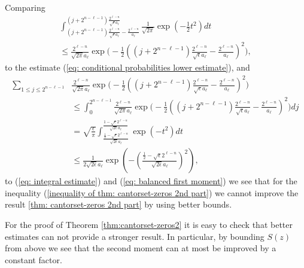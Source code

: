 \documentclass[11pt,reqno]{amsart}
\theoremstyle{plain}
\theoremstyle{definition}
\theoremstyle{remark}
\begin{document}
Comparing
\begin{multline*}
\int_{(j+2^{n-\ell-1})\frac{2^{\ell-n}}{\sqrt{\epsilon}a_\ell}-\frac{2^{\ell-n}}{a_\ell}}^{(j+2^{n-\ell-1})\frac{2^{\ell-n}}{\sqrt{\epsilon}a_\ell}} \frac{1}{\sqrt{2\pi}}\exp (-\frac{1}{2}t^2) dt \\ \leq
\frac{2^{\ell-n}}{\sqrt{2\pi}a_\ell} \exp\Big(-\frac{1}{2} {((j+2^{n-\ell-1})\frac{2^{\ell-n}}{\sqrt{\epsilon}a_\ell}-\frac{2^{\ell-n}}{a_\ell})^2}\Big),
\end{multline*}
to the estimate (\ref{eq: conditional probabilities lower estimate}), and
\begin{align*}
\sum_{1\leq j \leq 2^{n-\ell-1}}& \frac{2^{\ell-n}}{\sqrt{2\pi}a_\ell} \exp\Big(-\frac{1}{2} {((j+2^{n-\ell-1})\frac{2^{\ell-n}}{\sqrt{\epsilon}a_\ell}-\frac{2^{\ell-n}}{a_\ell})^2}\Big) \\ &\leq
\int_0^{2^{n-\ell-1}} \frac{2^{\ell-n}}{\sqrt{2\pi}a_\ell} \exp\Big(-\frac{1}{2} {((j+2^{n-\ell-1})\frac{2^{\ell-n}}{\sqrt{\epsilon}a_\ell}-\frac{2^{\ell-n}}{a_\ell})^2}\Big) dj \\
&= \sqrt{\frac{\epsilon}{\pi}} \int_{\frac{\frac{1}{2}-\sqrt{\epsilon}2^{\ell - n}}{\sqrt{2\epsilon}a_\ell}}^{\frac{1-\sqrt{\epsilon}2^{\ell - n}}{\sqrt{2\epsilon}a_\ell}} \exp (-t^2) dt \\
&\leq \frac{1}{2\sqrt{2\epsilon}a_\ell}\exp(- (\frac{\frac{1}{2}-\sqrt{\epsilon}2^{\ell - n}}{\sqrt{2\epsilon}a_\ell})^2),
\end{align*}
to (\ref{eq: integral estimate}) and (\ref{eq: balanced first moment})
we see that
for the inequality (\ref{inequality of thm: cantorset-zeros 2nd part}) we cannot improve the result \ref{thm: cantorset-zeros 2nd part} by using better bounds.

For the proof of Theorem \ref{thm:cantorset-zeros2} it is easy to check that better estimates can not provide a stronger result. In particular, by bounding $S(z)$ from above we see that the second moment can at most be improved by a constant factor.
\end{document}
